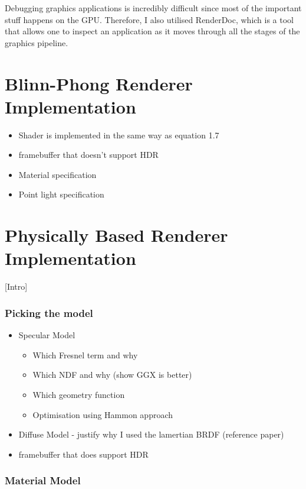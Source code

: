 Debugging graphics applications is incredibly difficult since most of the important stuff happens on the GPU. Therefore, I also utilised RenderDoc, which is a tool that allows one to inspect an application as it moves through all the stages of the graphics pipeline.

\section{Blinn-Phong Renderer Implementation} \label{BlinnPhongImplementation}

\begin{itemize}
	\item Shader is implemented in the same way as equation 1.7
	\item framebuffer that doesn't support HDR
	\item Material specification
	\item Point light specification
\end{itemize}

\section{Physically Based Renderer Implementation} \label{PBRImplementation}

[Intro]

\subsubsection{Picking the model}

\begin{itemize}
	\item Specular Model
	\begin{itemize}
		\item Which Fresnel term and why
		\item Which NDF and why (show GGX is better)
		\item Which geometry function
		\item Optimisation using Hammon approach
	\end{itemize}
	\item Diffuse Model - justify why I used the lamertian BRDF (reference paper)
	\item framebuffer that does support HDR
\end{itemize}

\subsubsection{Material Model}

